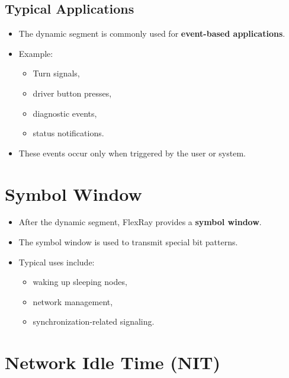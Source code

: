 \subsection*{Typical Applications}

\begin{itemize}
    \item The dynamic segment is commonly used for
    \textbf{event-based applications}.
    
    \item Example:
    \begin{itemize}
        \item Turn signals,
        \item driver button presses,
        \item diagnostic events,
        \item status notifications.
    \end{itemize}
    
    \item These events occur only when triggered by the user or system.
\end{itemize}

\section*{Symbol Window}

\begin{itemize}
    \item After the dynamic segment, FlexRay provides a
    \textbf{symbol window}.
    
    \item The symbol window is used to transmit special bit patterns.
    
    \item Typical uses include:
    \begin{itemize}
        \item waking up sleeping nodes,
        \item network management,
        \item synchronization-related signaling.
    \end{itemize}
\end{itemize}

\section*{Network Idle Time (NIT)}


